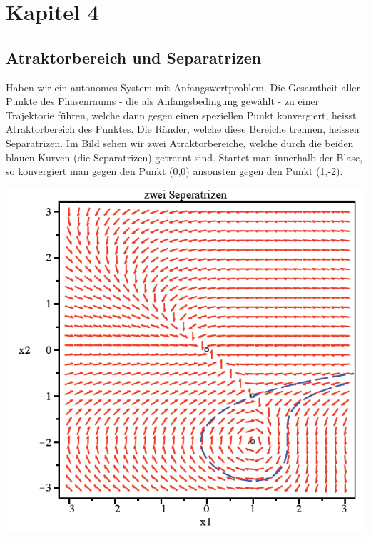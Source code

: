 \section{Kapitel 4}
\subsection{Atraktorbereich und Separatrizen}
Haben wir ein autonomes System mit Anfangswertproblem. Die Gesamtheit aller Punkte des Phasenraums - die als Anfangsbedingung gewählt - zu einer Trajektorie führen, welche dann gegen einen speziellen Punkt konvergiert, heisst Atraktorbereich des Punktes. 
Die Ränder, welche diese Bereiche trennen, heissen Separatrizen. 
Im Bild sehen wir zwei Atraktorbereiche, welche durch die beiden blauen Kurven (die Separatrizen) getrennt sind. 
Startet man innerhalb der Blase, so konvergiert man gegen den Punkt (0,0) ansonsten gegen den Punkt (1,-2). 
\begin{minipage}[h]{0.35\textwidth}
	\includegraphics[width=1.0\textwidth]{images/Atraktorbereich.png}
\end{minipage}
